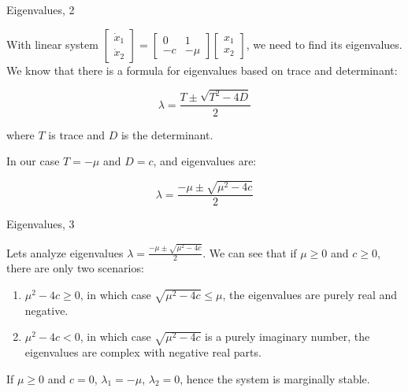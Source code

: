 \documentclass{beamer}
\begin{document}
\begin{frame}{Eigenvalues, 2}
	\begin{flushleft}
		
		With linear system 
		$
		\begin{bmatrix}
			\dot x_1 \\ \dot x_2
		\end{bmatrix}
		=
		\begin{bmatrix}
			0 & 1 \\
			-c & -\mu
		\end{bmatrix} 
		\begin{bmatrix}
			x_1 \\ x_2
		\end{bmatrix}   
		$, we need to find its eigenvalues. We know that there is a formula for eigenvalues based on trace and determinant:
		
		\begin{equation}
			\lambda = \frac{T \pm \sqrt{T^2 - 4D} }{2}
		\end{equation}
		
		where $T$ is trace and $D$ is the determinant.
		
		\bigskip
		
		In our case $T = -\mu$ and $D = c$, and eigenvalues are:
		
		\begin{equation}
			\lambda = \frac{-\mu \pm \sqrt{\mu^2 - 4c} }{2}
		\end{equation}
		
		
	\end{flushleft}
\end{frame}



\begin{frame}{Eigenvalues, 3}
	\begin{flushleft}
		
		Lets analyze eigenvalues $\lambda = \frac{-\mu \pm \sqrt{\mu^2 - 4c} }{2}$. We can see that if $\mu \geq 0$ and $c \geq 0$, there are only two scenarios: 
		
		\begin{enumerate}
			\item $\mu^2 - 4c \geq 0$, in which case $\sqrt{\mu^2 - 4c} \leq \mu$, the eigenvalues are purely real and negative.
			\item $\mu^2 - 4c < 0$, in which case $\sqrt{\mu^2 - 4c}$ is a purely imaginary number, the eigenvalues are complex with negative real parts.
		\end{enumerate}
		
		If $\mu \geq 0$ and $c = 0$, $\lambda_1 = -\mu$, $\lambda_2 = 0$, hence the system is marginally stable.
		
	\end{flushleft}
\end{frame}
\end{document}
